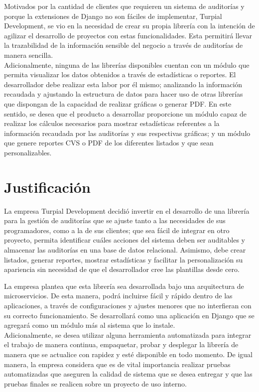 Motivados por la cantidad de clientes que requieren un sistema de auditorías y
porque la extensiones de Django no son fáciles de implementar, Turpial
Development, se vio en la necesidad de crear su propia librería con la intención de agilizar
el desarrollo de proyectos con estas funcionalidades. Esta permitirá
llevar la trazabilidad de la información sensible del negocio a través de
auditorías de manera sencilla.\\

Adicionalmente, ninguna de las librerías disponibles cuentan con un módulo que
permita visualizar los datos obtenidos a través de estadísticas o reportes. El
desarrollador debe realizar esta labor por él mismo; analizando la información
recaudada y ajustando la estructura de datos para hacer uso de otras librerías
que dispongan de la capacidad de realizar gráficas o generar PDF. En este
sentido, se desea que el producto a desarrollar proporcione un módulo capaz de
realizar los cálculos necesarios para mostrar estadísticas referentes a la
información recaudada por las auditorías y sus respectivas gráficas; y un
módulo que genere reportes CVS o PDF de los diferentes listados y que sean
personalizables.

\section{Justificación}

La empresa Turpial Development decidió invertir en el desarrollo de una
librería para la gestión de auditorías que se ajuste tanto a las necesidades de
sus programadores, como a la de sus clientes; que sea fácil de integrar en otro proyecto,
permita identificar cuáles acciones del sistema deben ser
auditables y almacenar las auditorías en una base de datos relacional. Asimismo, debe
crear listados, generar reportes, mostrar estadísticas y facilitar la personalización su apariencia sin necesidad de que el
desarrollador cree las plantillas desde cero.

La empresa plantea que esta librería sea desarrollada bajo una arquitectura de
microservicios. De esta manera, podrá incluirse fácil y rápido dentro de las aplicaciones, a través de
configuraciones y ajustes menores que no interfieran con su correcto
funcionamiento. Se desarrollará como una aplicación en Django que se agregará
como un módulo más al sistema que lo instale.\\

Adicionalmente, se desea utilizar alguna herramienta automatizada para integrar
el trabajo de manera continua, empaquetar, probar y desplegar la librería de
manera que se actualice con rapidez y esté disponible en todo momento.
De igual manera, la empresa considera que es de vital importancia realizar pruebas
automatizadas que aseguren la calidad de sistema que se desea entregar y que
las pruebas finales se realicen sobre un proyecto de uso interno.

